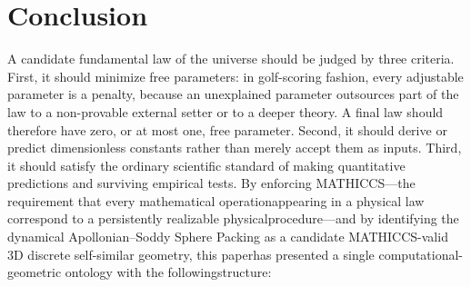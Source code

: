 \documentclass[11pt,a4paper]{article}
\begin{document}


\section{Conclusion}

A candidate fundamental law of the universe should be judged by three criteria. First, it should minimize free parameters: in golf-scoring fashion, every adjustable parameter is a penalty, because an unexplained parameter outsources part of the law to a non-provable external setter or to a deeper theory. A final law should therefore have zero, or at most one, free parameter. Second, it should derive or predict dimensionless constants rather than merely accept them as inputs. Third, it should satisfy the ordinary scientific standard of making quantitative predictions and surviving empirical tests.
By enforcing MATHICCS---the requirement that every mathematical operationappearing in a physical law correspond to a persistently realizable physicalprocedure---and by identifying the dynamical Apollonian--Soddy Sphere Packing as a candidate MATHICCS-valid 3D discrete self-similar geometry, this paperhas presented a single computational-geometric ontology with the followingstructure:
\end{document}
